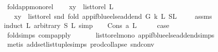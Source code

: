 \begin{isabellebody}
\isamarkupfalse%
%
\endisatagproof
{\isafoldproof}%
%
\isadelimproof
\isanewline
%
\endisadelimproof
\isanewline
{}\isamarkupfalse%
\ fold{\isacharunderscore}{\kern0pt}app{\isacharunderscore}{\kern0pt}mono{\isacharunderscore}{\kern0pt}rel{\isacharcolon}{\kern0pt}\ \isanewline
\ \ \ {\isachardoublequoteopen}{\isacharparenleft}{\kern0pt}x{\isacharcomma}{\kern0pt}y{\isacharparenright}{\kern0pt}\ {\isasymin}\ list{\isacharunderscore}{\kern0pt}to{\isacharunderscore}{\kern0pt}rel\ L{}{\isachardoublequoteclose}\isanewline
\ \ \ {\isachardoublequoteopen}{\isacharparenleft}{\kern0pt}x{\isacharcomma}{\kern0pt}y{\isacharparenright}{\kern0pt}\ {\isasymin}\ list{\isacharunderscore}{\kern0pt}to{\isacharunderscore}{\kern0pt}rel\ {\isacharparenleft}{\kern0pt}snd\ {\isacharparenleft}{\kern0pt}fold\ {\isacharparenleft}{\kern0pt}app{\isacharunderscore}{\kern0pt}if{\isacharunderscore}{\kern0pt}blue{\isacharunderscore}{\kern0pt}else{\isacharunderscore}{\kern0pt}add{\isacharunderscore}{\kern0pt}end\ G\ k{\isacharparenright}{\kern0pt}\ L{}\ {\isacharparenleft}{\kern0pt}S{\isacharcomma}{\kern0pt}L{}{\isacharparenright}{\kern0pt}{\isacharparenright}{\kern0pt}{\isacharparenright}{\kern0pt}{\isachardoublequoteclose}\ \isanewline
%
\isadelimproof
\ \ %
\endisadelimproof
%
\isatagproof
{}\isamarkupfalse%
\ assms\ \isanewline
{}\isamarkupfalse%
{\isacharparenleft}{\kern0pt}induct\ L{}\ arbitrary{\isacharcolon}{\kern0pt}\ S\ L{}{\isacharcomma}{\kern0pt}\ simp{\isacharparenright}{\kern0pt}\isanewline
\ \ \isamarkupfalse%
\ {\isacharparenleft}{\kern0pt}Cons\ a\ L{}{\isacharparenright}{\kern0pt}\isanewline
\ \ \isamarkupfalse%
\ \isamarkupfalse%
\ {\isacharquery}{\kern0pt}case\ \isanewline
\ \ \ \ \isamarkupfalse%
\ fold{\isachardot}{\kern0pt}simps{\isacharparenleft}{\kern0pt}{}{\isacharparenright}{\kern0pt}\ comp{\isacharunderscore}{\kern0pt}apply\ \isanewline
\ \ \ \ \isamarkupfalse%
\ list{\isacharunderscore}{\kern0pt}to{\isacharunderscore}{\kern0pt}rel{\isacharunderscore}{\kern0pt}mono\ app{\isacharunderscore}{\kern0pt}if{\isacharunderscore}{\kern0pt}blue{\isacharunderscore}{\kern0pt}else{\isacharunderscore}{\kern0pt}add{\isacharunderscore}{\kern0pt}end{\isachardot}{\kern0pt}simps\isanewline
\ \ \ \ \isamarkupfalse%
\ {\isacharparenleft}{\kern0pt}metis\ add{\isacharunderscore}{\kern0pt}set{\isacharunderscore}{\kern0pt}list{\isacharunderscore}{\kern0pt}tuple{\isachardot}{\kern0pt}simps\ prod{\isachardot}{\kern0pt}collapse\ snd{\isacharunderscore}{\kern0pt}conv{\isacharparenright}{\kern0pt}\isanewline

\end{isabellebody}
